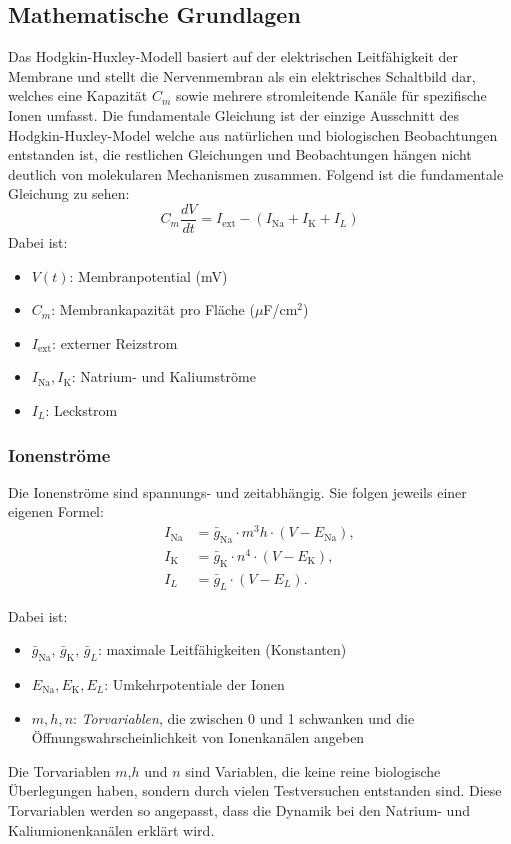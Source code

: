 \begin{refsection}
\subsection{Mathematische Grundlagen}
Das Hodgkin-Huxley-Modell basiert auf der elektrischen Leitfähigkeit der Membrane und stellt die Nervenmembran als ein elektrisches Schaltbild dar, welches eine Kapazität $C_m$ sowie mehrere stromleitende Kanäle für spezifische Ionen umfasst.
Die fundamentale Gleichung ist der einzige Ausschnitt des Hodgkin-Huxley-Model welche aus natürlichen und biologischen Beobachtungen entstanden ist, die restlichen Gleichungen und Beobachtungen hängen nicht deutlich von molekularen Mechanismen zusammen. 
Folgend ist die fundamentale Gleichung zu sehen:
\[C_m \frac{dV}{dt} = I_{\text{ext}} - (I_{\text{Na}} + I_{\text{K}} + I_L)\]
Dabei ist:

\begin{itemize}
	\item $V(t)$: Membranpotential (mV)
	\item $C_m$: Membrankapazität pro Fläche ($\mu$F/cm$^2$)
	\item $I_{\text{ext}}$: externer Reizstrom
	\item $I_{\text{Na}}, I_{\text{K}}$: Natrium- und Kaliumströme
	\item $I_L$: Leckstrom
\end{itemize}
\subsubsection{Ionenströme}
Die Ionenströme sind spannungs- und zeitabhängig. Sie folgen jeweils einer eigenen Formel:
\[
\begin{aligned}
	I_{\text{Na}} &= \bar{g}_{\text{Na}} \cdot m^3 h \cdot (V - E_{\text{Na}}), \\
	I_{\text{K}} &= \bar{g}_{\text{K}} \cdot n^4 \cdot (V - E_{\text{K}}), \\
	I_L &= \bar{g}_L \cdot (V - E_L).
\end{aligned}
\]

\noindent Dabei ist:

\begin{itemize}
	\item $\bar{g}_{\text{Na}},\, \bar{g}_{\text{K}},\, \bar{g}_L$: maximale Leitfähigkeiten (Konstanten)
	\item $E_{\text{Na}}, E_{\text{K}}, E_L$: Umkehrpotentiale der Ionen
	\item $m, h, n$: \emph{Torvariablen}, die zwischen 0 und 1 schwanken und die Öffnungswahrscheinlichkeit von Ionenkanälen angeben
\end{itemize}
Die Torvariablen $m$,$h$ und $n$ sind Variablen, die keine reine biologische Überlegungen haben, sondern durch vielen Testversuchen entstanden sind. Diese Torvariablen werden so angepasst, dass die Dynamik bei den Natrium- und Kaliumionenkanälen erklärt wird.

\end{refsection}
